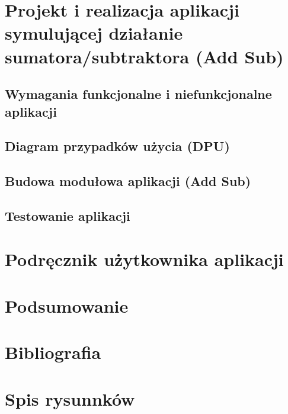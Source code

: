 \documentclass[12pt, a4paper, onside, polish]{article}				%
\begin{document}
\section{Projekt i realizacja aplikacji symulującej działanie sumatora/subtraktora (Add Sub)}
\subsection{Wymagania funkcjonalne i niefunkcjonalne aplikacji}
\cleardoublepage

\subsection{Diagram przypadków użycia (DPU)}
\cleardoublepage

\subsection{Budowa modułowa aplikacji (Add Sub)}
\cleardoublepage

\subsection{Testowanie aplikacji}
\cleardoublepage



\section{Podręcznik użytkownika aplikacji}
\cleardoublepage




\section{Podsumowanie}
\cleardoublepage
\section{Bibliografia}
\cleardoublepage
\section{Spis rysunnków}
\cleardoublepage
\end{document}
